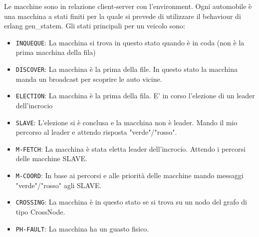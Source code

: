 \documentclass{memoir}
\begin{document}
Le macchine sono in relazione client-server con l'environment. Ogni automobile è
una macchina a stati finiti per la quale si prevede di utilizzare il behaviour
di erlang gen\_statem. Gli stati principali per un veicolo sono:
\begin{itemize}
\item \texttt{INQUEQUE}: La macchina si trova in questo stato quando è in coda
  (non è la prima macchina della fila)
\item \texttt{DISCOVER}: La macchina è la prima della file. In questo stato la
  macchina manda un broadcast per scoprire le auto vicine.
\item \texttt{ELECTION}: La macchina è la prima della fila. E' in corso
  l'elezione di un leader dell'incrocio
\item \texttt{SLAVE}: L'elezione si è conclusa e la macchina non è leader. Mando
  il mio percorso al leader e attendo risposta "verde"/"rosso".
\item \texttt{M-FETCH}: La macchina è stata eletta leader dell'incrocio. Attendo
  i percorsi delle macchine SLAVE.
\item \texttt{M-COORD}: In base ai percorsi e alle priorità delle macchine mando
  messaggi "verde"/"rosso" agli SLAVE.
\item \texttt{CROSSING}: La macchina è in questo stato se si trova su un nodo
  del grafo di tipo CrossNode.
\item \texttt{PH-FAULT}: La macchina ha un guasto fisico.
\end{itemize}
\end{document}
